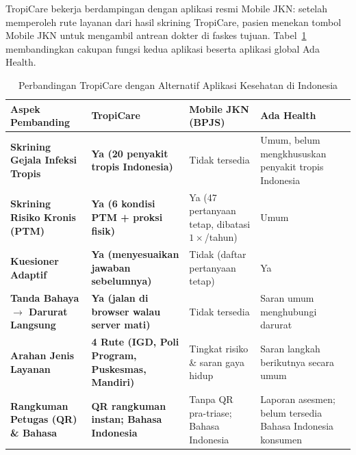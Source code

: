 TropiCare bekerja berdampingan dengan aplikasi resmi Mobile JKN: setelah memperoleh rute layanan dari hasil skrining TropiCare, pasien menekan tombol Mobile JKN untuk mengambil antrean dokter di faskes tujuan. Tabel~\ref{tab:keunggulan} membandingkan cakupan fungsi kedua aplikasi beserta aplikasi global Ada Health.

\begin{table}[H]
\centering
\footnotesize
\caption{Perbandingan TropiCare dengan Alternatif Aplikasi Kesehatan di Indonesia}\label{tab:keunggulan}
\vspace{3pt}
\begin{tabularx}{\textwidth}{p{3.6cm} X X X}
\toprule
\textbf{Aspek Pembanding} & \textbf{TropiCare} & \textbf{Mobile JKN (BPJS)} & \textbf{Ada Health} \\
\midrule
\textbf{Skrining Gejala Infeksi Tropis} & \textbf{Ya (20 penyakit tropis Indonesia)} & Tidak tersedia & Umum, belum mengkhususkan penyakit tropis Indonesia \\
\midrule
\textbf{Skrining Risiko Kronis (PTM)} & \textbf{Ya (6 kondisi PTM + proksi fisik)} & Ya (47 pertanyaan tetap, dibatasi $1\times$/tahun) & Umum \\
\midrule
\textbf{Kuesioner Adaptif} & \textbf{Ya (menyesuaikan jawaban sebelumnya)} & Tidak (daftar pertanyaan tetap) & Ya \\
\midrule
\textbf{Tanda Bahaya $\rightarrow$ Darurat Langsung} & \textbf{Ya (jalan di browser walau server mati)} & Tidak tersedia & Saran umum menghubungi darurat \\
\midrule
\textbf{Arahan Jenis Layanan} & \textbf{4 Rute (IGD, Poli Program, Puskesmas, Mandiri)} & Tingkat risiko \& saran gaya hidup & Saran langkah berikutnya secara umum \\
\midrule
\textbf{Rangkuman Petugas (QR) \& Bahasa} & \textbf{QR rangkuman instan; Bahasa Indonesia} & Tanpa QR pra-triase; Bahasa Indonesia & Laporan asesmen; belum tersedia Bahasa Indonesia konsumen \\
\bottomrule
\end{tabularx}
\end{table}
